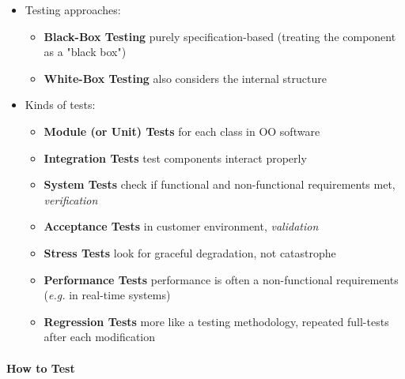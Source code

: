 \documentclass[a4paper]{article}
\providecommand{\tightlist}{%
  \setlength{\itemsep}{0pt}\setlength{\parskip}{0pt}}
\let\oldparagraph\paragraph
\renewcommand{\paragraph}[1]{\oldparagraph{#1}\mbox{}}
\begin{document}
\begin{itemize}
\tightlist
\item
  Testing approaches:

  \begin{itemize}
  \tightlist
  \item
    \textbf{Black-Box Testing} purely specification-based (treating the
    component as a "black box")
  \item
    \textbf{White-Box Testing} also considers the internal structure
  \end{itemize}
\item
  Kinds of tests:

  \begin{itemize}
  \tightlist
  \item
    \textbf{Module (or Unit) Tests} for each class in OO software
  \item
    \textbf{Integration Tests} test components interact properly
  \item
    \textbf{System Tests} check if functional and non-functional
    requirements met, \emph{verification}
  \item
    \textbf{Acceptance Tests} in customer environment, \emph{validation}
  \item
    \textbf{Stress Tests} look for graceful degradation, not catastrophe
  \item
    \textbf{Performance Tests} performance is often a non-functional
    requirements (\emph{e.g.} in real-time systems)
  \item
    \textbf{Regression Tests} more like a testing methodology, repeated
    full-tests after each modification
  \end{itemize}
\end{itemize}

\hypertarget{how-to-test}{%
\paragraph{How to Test}\label{how-to-test}}
\end{document}
